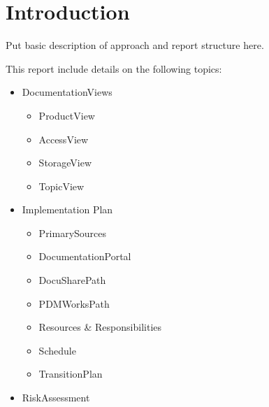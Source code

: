 \section{Introduction}

Put basic description of approach and report structure here.

This report include details on the following topics:

\begin{itemize}

\item DocumentationViews
	\begin{itemize}
	\item ProductView
	\item AccessView
	\item  StorageView
	\item TopicView
	\end{itemize}
	
\item Implementation Plan
	\begin{itemize}
	\item PrimarySources
	\item DocumentationPortal
	\item DocuSharePath
	\item PDMWorksPath
	\item Resources \& Responsibilities
	\item Schedule
	\item TransitionPlan
	\end{itemize}
	
\item RiskAssessment

\end{itemize}
